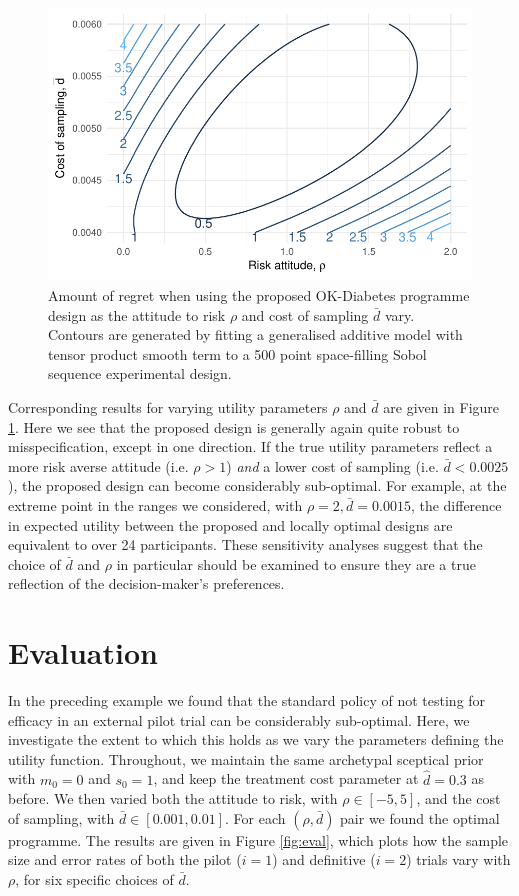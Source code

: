 \documentclass[sagev, Crown]{sagej}
\begin{document}
\begin{figure}
\centering
\includegraphics[scale=0.8]{./figures/sens_u.pdf}
\caption{Amount of regret when using the proposed OK-Diabetes programme design as the attitude to risk $\rho$ and cost of sampling $\bar{d}$ vary. Contours are generated by fitting a generalised additive model with tensor product smooth term to a 500 point space-filling Sobol sequence experimental design.}
\label{fig:sens_u}
\end{figure}

Corresponding results for varying utility parameters $\rho$ and $\bar{d}$ are given in Figure \ref{fig:sens_u}. Here we see that the proposed design is generally again quite robust to misspecification, except in one direction. If the true utility parameters reflect a more risk averse attitude (i.e. $\rho > 1$) \emph{and} a lower cost of sampling (i.e. $\bar{d} < 0.0025$), the proposed design can become considerably sub-optimal. For example, at the extreme point in the ranges we considered, with $\rho = 2, \bar{d} = 0.0015$, the difference in expected utility between the proposed and locally optimal designs are equivalent to over 24 participants. These sensitivity analyses suggest that the choice of $\bar{d}$ and $\rho$ in particular should be examined to ensure they are a true reflection of the decision-maker's preferences.


\section{Evaluation}\label{sec:evaluation}

In the preceding example we found that the standard policy of not testing for efficacy in an external pilot trial can be considerably sub-optimal. Here, we investigate the extent to which this holds as we vary the parameters defining the utility function. Throughout, we maintain the same archetypal sceptical prior with $m_0 = 0$ and $s_0 = 1$, and keep the treatment cost parameter at $\hat{d} = 0.3$ as before. We then varied both the attitude to risk, with $\rho \in [-5, 5]$, and the cost of sampling, with $\bar{d} \in [0.001, 0.01]$. For each $(\rho, \bar{d})$ pair we found the optimal programme. The results are given in Figure \ref{fig:eval}, which plots how the sample size and error rates of both the pilot ($i = 1$) and definitive ($i = 2$) trials vary with $\rho$, for six specific choices of $\bar{d}$.
\end{document}
